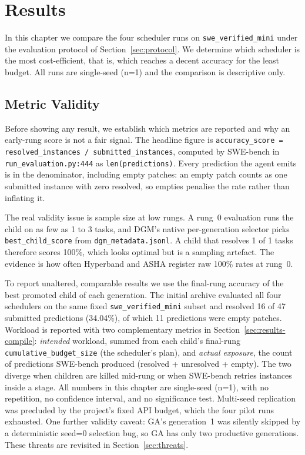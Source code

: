 \chapter{Results}
\label{chap:results}

In this chapter we compare the four scheduler runs on
\texttt{swe\_verified\_mini} under the evaluation protocol of
Section~\ref{sec:protocol}. We determine which scheduler is the most
cost-efficient, that is, which reaches a decent accuracy for the least
budget. All runs are single-seed (n=1) and the comparison is descriptive
only.

\section{Metric Validity}
\label{sec:results-validity}

Before showing any result, we establish which metrics are reported and
why an early-rung score is not a fair signal. The headline figure is
\texttt{accuracy\_score = resolved\_instances / submitted\_instances},
computed by SWE-bench in
\texttt{run\_evaluation.py:444} as \texttt{len(predictions)}. Every
prediction the agent emits is in the denominator, including empty
patches: an empty patch counts as one submitted instance with zero
resolved, so empties penalise the rate rather than inflating it.

The real validity issue is sample size at low rungs. A rung~0
evaluation runs the child on as few as 1 to 3 tasks, and DGM's native
per-generation selector picks \texttt{best\_child\_score} from
\texttt{dgm\_metadata.jsonl}. A child that resolves 1 of 1 tasks
therefore scores 100\%, which looks optimal but is a sampling
artefact. The evidence is how often Hyperband and ASHA register raw
100\% rates at rung~0.

To report unaltered, comparable results we use the final-rung accuracy
of the best promoted child of each generation. The initial archive
evaluated all four schedulers on the same fixed
\texttt{swe\_verified\_mini} subset and resolved 16 of 47 submitted
predictions (34.04\%), of which 11 predictions were empty patches.
Workload is reported with two complementary metrics in
Section~\ref{sec:results-compile}: \emph{intended} workload, summed
from each child's final-rung \texttt{cumulative\_budget\_size} (the
scheduler's plan), and \emph{actual exposure}, the count of
predictions SWE-bench produced (resolved + unresolved + empty). The
two diverge when children are killed mid-rung or when SWE-bench
retries instances inside a stage. All numbers in this chapter are
single-seed (n=1), with no repetition, no confidence interval, and no
significance test. Multi-seed replication was precluded by the
project's fixed API budget, which the four pilot runs exhausted. One
further validity caveat: GA's generation~1 was silently skipped by a
deterministic seed=0 selection bug, so GA has only two productive
generations. These threats are revisited in
Section~\ref{sec:threats}.

